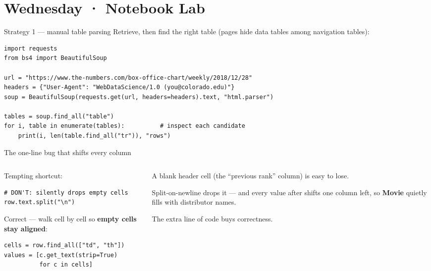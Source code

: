 \documentclass[9pt,aspectratio=169]{beamer}
\begin{document}
\section{Wednesday · Notebook Lab}

\begin{frame}[fragile]{Strategy 1 --- manual table parsing}
    Retrieve, then find the right table (pages hide data tables among navigation tables):
\begin{lstlisting}
import requests
from bs4 import BeautifulSoup

url = "https://www.the-numbers.com/box-office-chart/weekly/2018/12/28"
headers = {"User-Agent": "WebDataScience/1.0 (you@colorado.edu)"}
soup = BeautifulSoup(requests.get(url, headers=headers).text, "html.parser")

tables = soup.find_all("table")
for i, table in enumerate(tables):          # inspect each candidate
    print(i, len(table.find_all("tr")), "rows")
\end{lstlisting}
\end{frame}

\begin{frame}[fragile]{The one-line bug that shifts every column}
    \begin{columns}[T]
        \begin{column}{0.52\textwidth}
        Tempting shortcut:
\begin{lstlisting}
# DON'T: silently drops empty cells
row.text.split("\n")
\end{lstlisting}
        Correct --- walk cell by cell so \textbf{empty cells stay aligned}:
\begin{lstlisting}
cells = row.find_all(["td", "th"])
values = [c.get_text(strip=True)
          for c in cells]
\end{lstlisting}
        \end{column}
        \begin{column}{0.44\textwidth}
            A blank header cell (the ``previous rank'' column) is easy to lose.

            \vspace{0.75em}

            Split-on-newline drops it --- and every value after shifts one column left, so \textbf{Movie} quietly fills with distributor names.

            \vspace{0.75em}

            The extra line of code buys correctness.
        \end{column}
    \end{columns}
\end{frame}
\end{document}
